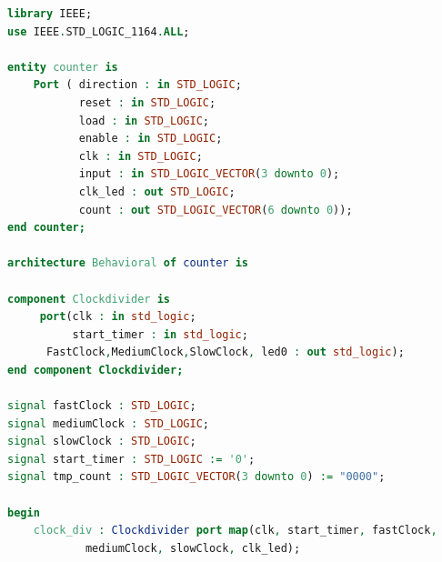 \documentclass[11pt]{article}
\begin{document}
\begin{appendices}
\begin{lstlisting}[language=VHDL]
library IEEE;
use IEEE.STD_LOGIC_1164.ALL;

entity counter is
    Port ( direction : in STD_LOGIC;
           reset : in STD_LOGIC;
           load : in STD_LOGIC;
           enable : in STD_LOGIC;
           clk : in STD_LOGIC;
           input : in STD_LOGIC_VECTOR(3 downto 0);
           clk_led : out STD_LOGIC;
           count : out STD_LOGIC_VECTOR(6 downto 0));
end counter;

architecture Behavioral of counter is

component Clockdivider is
     port(clk : in std_logic;
          start_timer : in std_logic;
	  FastClock,MediumClock,SlowClock, led0 : out std_logic);
end component Clockdivider;

signal fastClock : STD_LOGIC;
signal mediumClock : STD_LOGIC;
signal slowClock : STD_LOGIC;
signal start_timer : STD_LOGIC := '0';
signal tmp_count : STD_LOGIC_VECTOR(3 downto 0) := "0000";

begin
    clock_div : Clockdivider port map(clk, start_timer, fastClock, 
    		mediumClock, slowClock, clk_led);


\end{lstlisting}
\end{appendices}
\end{document}
